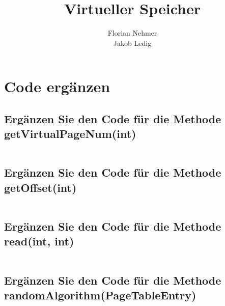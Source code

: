 \documentclass[]{scrartcl}
\begin{document}
\setlength{\parindent}{0em} 


\lstset{escapechar=@,style=customc}

\title{Virtueller Speicher}
\author{Florian Nehmer\\ 
	Jakob Ledig}



\maketitle

\section{Code erg\"anzen}

\subsection{Erg\"anzen Sie den Code f\"ur die Methode getVirtualPageNum(int)}

\inputminted[linenos,frame=lines,fontsize=\scriptsize]{Java}{JavaFiles/getVirtualPageNum}


\subsection{Erg\"anzen Sie den Code f\"ur die Methode getOffset(int)}
\inputminted[linenos,frame=lines,fontsize=\scriptsize]{Java}{JavaFiles/getOffset}


\subsection{Erg\"anzen Sie den Code f\"ur die Methode read(int, int)}
\inputminted[linenos,frame=lines,fontsize=\scriptsize]{Java}{JavaFiles/read}


\subsection{Erg\"anzen Sie den Code f\"ur die Methode randomAlgorithm(PageTableEntry)}
\inputminted[linenos,frame=lines,fontsize=\scriptsize]{Java}{JavaFiles/randomAlgorithm}
\end{document}
